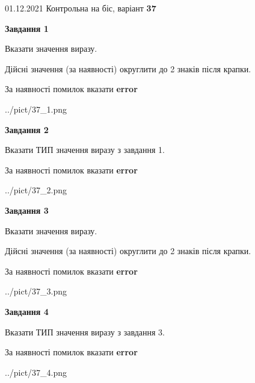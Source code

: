 \documentclass[11pt, ukrainian]{article}
\begin{document}
{01.12.2021 Контрольна на біс, варіант  \No \textbf { 37 }\par}
{
\begin {large}
{\begin {center}\textbf{Завдання 1}\end {center}}\par
Вказати значення виразу. \par
Дійсні значення (за наявності) округлити до 2 знаків після крапки. \par
За наявності помилок вказати \textbf{error}

\begin{center}
	{../pict/37_1.png}
\end{center}
\newpage

{\begin {center}\textbf{Завдання 2}\end {center}}\par
Вказати ТИП значення виразу з завдання 1. \par
За наявності помилок вказати \textbf{error}

\begin{center}
	{../pict/37_2.png}
\end{center}
\newpage

{\begin {center}\textbf{Завдання 3}\end {center}}\par
Вказати значення виразу. \par
Дійсні значення (за наявності) округлити до 2 знаків після крапки. \par
За наявності помилок вказати \textbf{error}

\begin{center}
	{../pict/37_3.png}
\end{center}
\newpage

{\begin {center}\textbf{Завдання 4}\end {center}}\par
Вказати ТИП значення виразу з завдання 3. \par
За наявності помилок вказати \textbf{error}

\begin{center}
	{../pict/37_4.png}
\end{center}
\newpage


\end{large}}
\end{document}
